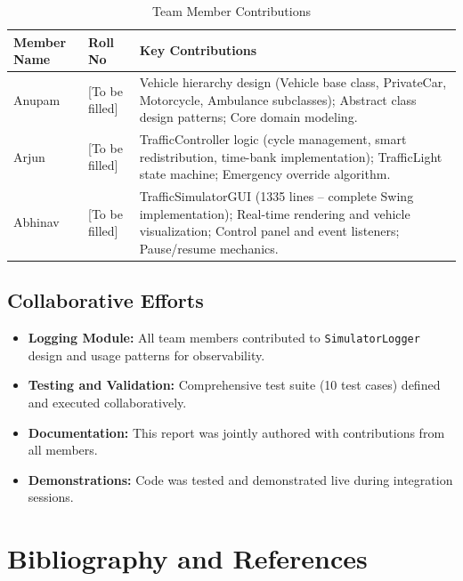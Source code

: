\documentclass[12pt,a4paper]{article}
\begin{document}
\begin{table}[h]
    \centering
    \begin{tabularx}{\textwidth}{|l|l|X|}
        \hline
        \textbf{Member Name} & \textbf{Roll No} & \textbf{Key Contributions} \\ \hline
        Anupam & [To be filled] & 
        Vehicle hierarchy design (Vehicle base class, PrivateCar, Motorcycle, Ambulance subclasses); 
        Abstract class design patterns; 
        Core domain modeling. \\ \hline
        
        Arjun & [To be filled] & 
        TrafficController logic (cycle management, smart redistribution, time-bank implementation); 
        TrafficLight state machine; 
        Emergency override algorithm. \\ \hline
        
        Abhinav & [To be filled] & 
        TrafficSimulatorGUI (1335 lines – complete Swing implementation); 
        Real-time rendering and vehicle visualization; 
        Control panel and event listeners; 
        Pause/resume mechanics. \\ \hline
    \end{tabularx}
    \caption{Team Member Contributions}
\end{table}

\subsection{Collaborative Efforts}
\begin{itemize}
    \item \textbf{Logging Module:} All team members contributed to \texttt{SimulatorLogger} design and usage patterns for observability.
    \item \textbf{Testing and Validation:} Comprehensive test suite (10 test cases) defined and executed collaboratively.
    \item \textbf{Documentation:} This report was jointly authored with contributions from all members.
    \item \textbf{Demonstrations:} Code was tested and demonstrated live during integration sessions.
\end{itemize}

\newpage

\section{Bibliography and References}
\end{document}
